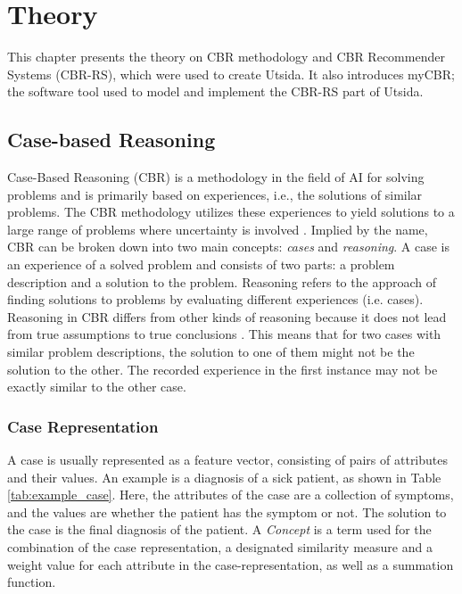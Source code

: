 \cleardoublepage

\chapter{Theory} \label{chap:3}

This chapter presents the theory on CBR methodology and CBR Recommender Systems (CBR-RS), which were used to create Utsida. It also introduces myCBR; the software tool used to model and implement the CBR-RS part of Utsida. 

\section{Case-based Reasoning}

Case-Based Reasoning (CBR) is a methodology in the field of AI for solving problems and is primarily based on experiences, i.e., the solutions of similar problems. The CBR methodology utilizes these experiences to yield solutions to a large range of problems where uncertainty is involved \cite{richter2013case}. Implied by the name, CBR can be broken down into two main concepts: \textit{cases} and \textit{reasoning}. A case is an experience of a solved problem and consists of two parts: a problem description and a solution to the problem. Reasoning refers to the approach of finding solutions to problems by evaluating different experiences (i.e. cases). Reasoning in CBR differs from other kinds of reasoning because it does not lead from true assumptions to true conclusions \cite{richter2013case}. This means that for two cases with similar problem descriptions, the solution to one of them might not be the solution to the other. The recorded experience in the first instance may not be exactly similar to the other case.
    
\subsection{Case Representation}\label{sec:feature_vectors}
A case is usually represented as a feature vector, consisting of pairs of attributes and their values. An example is a diagnosis of a sick patient, as shown in Table \ref{tab:example_case}. Here, the attributes of the case are a collection of symptoms, and the values are whether the patient has the symptom or not. The solution to the case is the final diagnosis of the patient. A \textit{Concept} is a term used for the combination of the case representation, a designated similarity measure and a weight value for each attribute in the case-representation, as well as a summation function.

